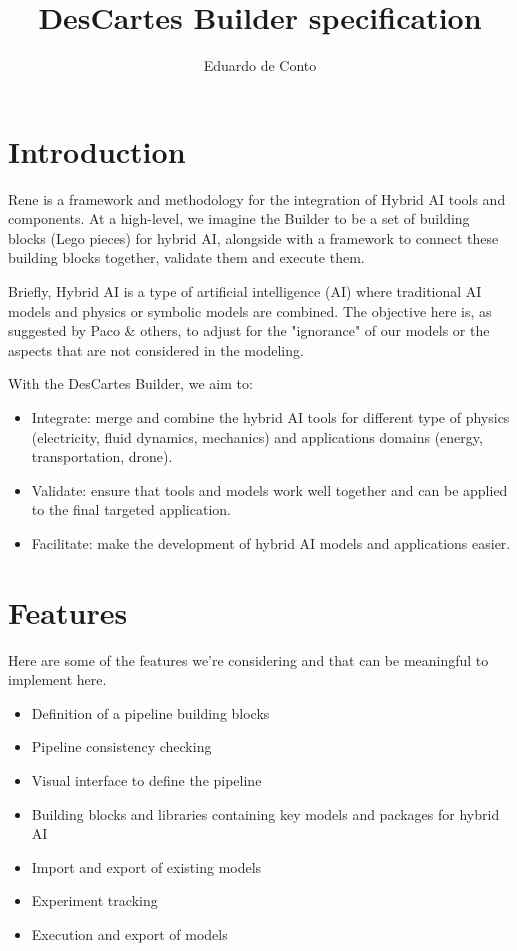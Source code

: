 \documentclass[a4paper,12pt]{article}
\title{DesCartes Builder specification}
\author{Eduardo de Conto}
\begin{document}
\maketitle


\section{Introduction}

Rene is a framework and methodology for the integration of Hybrid AI tools and
components. At a high-level, we imagine the Builder to be a set of building
blocks (Lego pieces) for hybrid AI, alongside with a framework to connect these
building blocks together, validate them and execute them.

Briefly, Hybrid AI is a type of artificial intelligence (AI) where
traditional AI models and physics or symbolic models are combined. The objective
here is, as suggested by Paco \& others, to adjust for the "ignorance" of our
models or the aspects that are not considered in the modeling.

With the DesCartes Builder, we aim to:
\begin{itemize}
  \item Integrate: merge and combine the hybrid AI tools for different type of
  physics (electricity, fluid dynamics, mechanics) and applications domains
  (energy, transportation, drone).
  \item Validate: ensure that tools and models work well together and can be
  applied to the final targeted application.
  \item Facilitate: make the development of hybrid AI models and applications
  easier.
\end{itemize}

\section{Features}
Here are some of the features we're considering and that can be meaningful to
implement here.
\begin{itemize}
  \item Definition of a pipeline building blocks
  \item Pipeline consistency checking
  \item Visual interface to define the pipeline
  \item Building blocks and libraries containing key models and packages for hybrid AI
  \item Import and export of existing models
  \item Experiment tracking
  \item Execution and export of models
\end{itemize}
\end{document}
